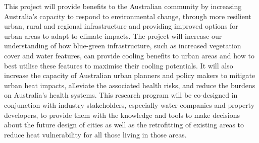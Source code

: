 


 
 
This project will provide benefits to the Australian community by increasing Australia's capacity to respond to environmental change, through more resilient urban, rural and regional infrastructure and providing improved options for urban areas to adapt to climate impacts. The project will increase our understanding of how blue-green infrastructure, such as increased vegetation cover and water features, can provide cooling benefits to urban areas and how to best utilise these features to maximise their cooling potentials. It will also increase the capacity of Australian urban planners and policy makers to mitigate urban heat impacts, alleviate the associated health risks, and reduce the burdens on Australia's health systems. This research program will be co-designed in conjunction with industry stakeholders, especially water companies and property developers, to provide them with the knowledge and tools to make decisions about the future design of cities as well as the retrofitting of existing areas to reduce heat vulnerability for all those living in those areas.



 

